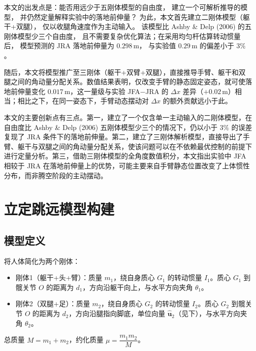\documentclass{article}
\begin{document}
本文的出发点是：能否用远少于五刚体模型的自由度，
建立一个可解析推导的模型，
并仍然定量解释实验中的落地前伸量？
为此，本文首先建立二刚体模型（躯干+双腿），
仅以收腿角速度作为主动输入。
该模型比 Ashby \& Delp (2006) 的五刚体模型少三个自由度，
且不需要复杂优化算法；在采用均匀杆估算转动惯量后，
模型预测的 JRA 落地前伸量为 $0.298$\,m，
与实验值 $0.29$\,m 的偏差小于 $3\%$。

随后，本文将模型推广至三刚体（躯干+双臂+双腿），直接推导手臂、躯干和双腿之间的角动量分配关系。数值结果表明，仅改变手臂的静态固定姿态，就可使落地前伸量变化 $0.017$\,m，这一量级与实验 JFA$-$JRA 的 $\Delta x$ 差异（$+0.02$\,m）相当；相比之下，在同一姿态下，手臂动态摆动对 $\Delta x$ 的额外贡献远小于此。

本文的主要创新点有三点。第一，建立了一个仅含单一主动输入的二刚体模型，在自由度比 Ashby \& Delp (2006) 五刚体模型少三个的情况下，仍以小于 $3\%$ 的误差复现了 JRA 条件下的落地前伸量。第二，建立了三刚体解析模型，直接导出了手臂、躯干与双腿之间的角动量分配关系，使该问题可以在不依赖最优控制的前提下进行定量分析。第三，借助三刚体模型的全角度数值积分，本文指出实验中 JFA 相较于 JRA 在落地前伸量上的优势，可能主要来自手臂静态位置改变了上体惯性分布，而非腾空阶段的主动摆动。

\section{立定跳远模型构建}

\subsection{模型定义}
将人体简化为两个刚体：
\begin{itemize}
\item 刚体1（躯干+头+臂）：质量 $m_1$，绕自身质心 $G_1$ 的转动惯量 $I_1$。质心 $G_1$ 到髋关节 $O$ 的距离为 $d_1$，方向沿躯干向上，与水平方向夹角 $\theta_1$。
\item 刚体2（双腿+足）：质量 $m_2$，绕自身质心 $G_2$ 的转动惯量 $I_2$。质心 $G_2$ 到髋关节 $O$ 的距离为 $d_2$，方向沿腿指向脚底，单位向量 $\hat{\mathbf{u}}_2$（见下），与水平方向夹角 $\theta_2$。
\end{itemize}
总质量 $M = m_1 + m_2$，约化质量 $\mu = \dfrac{m_1 m_2}{M}$。
\end{document}
